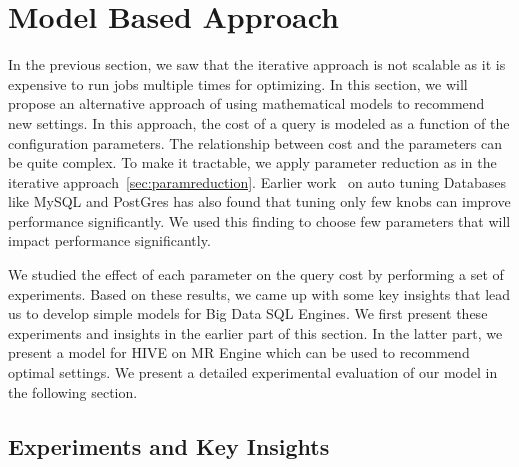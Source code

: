 \section{Model Based Approach}

In the previous section, we saw that the iterative approach is not scalable as it is expensive to run jobs multiple times for optimizing. In this section, we will propose an alternative approach of using mathematical models to recommend new settings. In this approach, the cost of a query is modeled as a function of the configuration parameters. The relationship between cost and the parameters can be quite complex. To make it tractable, we apply parameter reduction as in the iterative approach~\ref{sec:paramreduction}. Earlier work~\cite{VanKen} on auto tuning Databases like MySQL and PostGres has also found that tuning only few knobs can improve performance significantly. We used this finding to choose few parameters that will impact performance significantly. 

We studied the effect of each parameter on the query cost by performing a set of experiments. Based on these results, we came up with some key insights that lead us to develop simple models for Big Data SQL Engines. We first present these experiments and insights in the earlier part of this section. In the latter part, we present a model for HIVE on MR Engine which can be used to recommend optimal settings. We present a detailed experimental evaluation of our model in the following section.

\subsection{Experiments and Key Insights}

